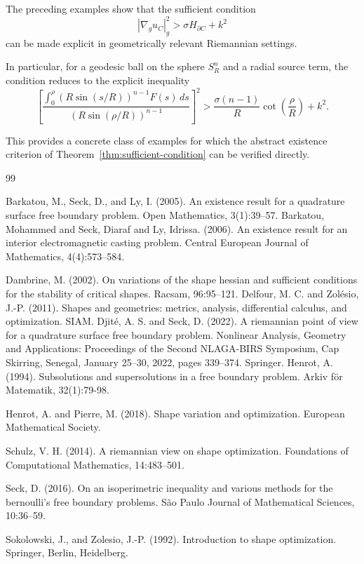 \documentclass{article}
\begin{document}
The preceding examples show that the sufficient condition
\[
|\nabla_g u_C|_g^2
>
\sigma H_{\partial C}+k^2
\]
can be made explicit in geometrically relevant Riemannian settings.

In particular, for a geodesic ball on the sphere $S_R^n$ and a radial
source term, the condition reduces to the explicit inequality
\[
\left[
\frac{
\displaystyle
\int_0^\rho
\left(R\sin(s/R)\right)^{n-1}
F(s)\,ds
}{
\left(R\sin(\rho/R)\right)^{n-1}
}
\right]^2
>
\frac{\sigma(n-1)}{R}
\cot\left(\frac{\rho}{R}\right)
+
k^2.
\]

This provides a concrete class of examples for which the abstract
existence criterion of Theorem~\ref{thm:sufficient-condition} can be
verified directly.



\begin{thebibliography}{99} %

Barkatou, M., Seck, D., and Ly, I. (2005). An existence result for a quadrature surface free boundary problem. Open Mathematics, 3(1):39--57.
Barkatou, Mohammed and Seck, Diaraf and Ly, Idrissa. (2006). An existence result for an interior electromagnetic casting problem. Central European Journal of Mathematics, 4(4):573--584.


Dambrine, M. (2002). On variations of the shape hessian and sufficient conditions for the stability of critical shapes. Racsam, 96:95--121.
Delfour, M. C. and Zol{\'e}sio, J.-P. (2011). Shapes and geometries: metrics, analysis, differential calculus,
  and optimization. SIAM.
Djit{\'e}, A. S. and Seck, D. (2022). A riemannian point of view for a quadrature surface free boundary
  problem. Nonlinear Analysis, Geometry and Applications: Proceedings of
  the Second NLAGA-BIRS Symposium, Cap Skirring, Senegal, January 25--30,
  2022, pages 339--374. Springer.
Henrot, A. (1994). Subsolutions and supersolutions in a free boundary problem.
Arkiv f{\"o}r Matematik, 32(1):79-98.

Henrot, A. and Pierre, M. (2018). Shape variation and optimization. European Mathematical Society.

Schulz, V. H. (2014). A riemannian view on shape optimization. Foundations of Computational Mathematics, 14:483--501.

Seck, D. (2016). On an isoperimetric inequality and various methods for the bernoulli’s free boundary problems. S{\~a}o Paulo Journal of Mathematical Sciences, 10:36--59.

 Sokolowski, J., and Zolesio, J.-P. (1992).
Introduction to shape optimization. Springer, Berlin, Heidelberg.

\end{thebibliography}
\end{document}
